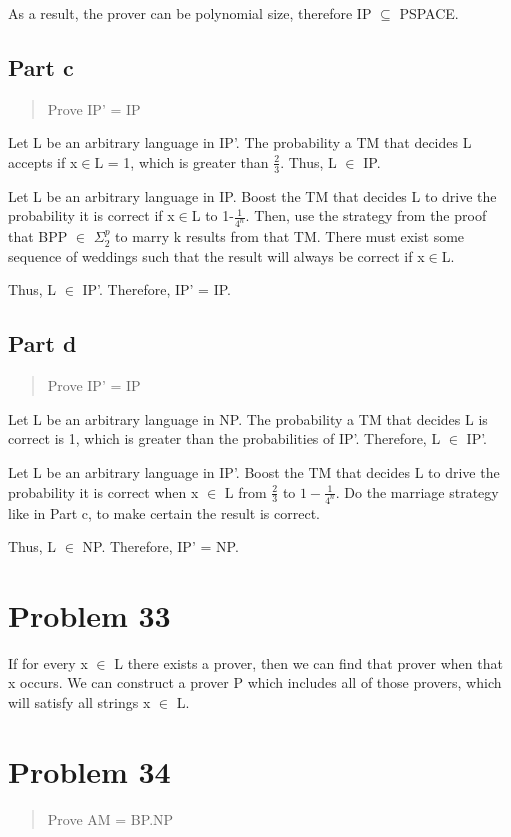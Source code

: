 \documentclass{article}
\begin{document}
\medskip
As a result, the prover can be polynomial size, therefore IP $\subseteq$ PSPACE.


\subsection{Part c}
\begin{quote}
Prove IP' = IP
\end{quote}

Let L be an arbitrary language in IP'.  The probability a TM that decides L accepts if x$\in$L = 1, which is greater than $\frac23$.  Thus, L $\in$ IP.

Let L be an arbitrary language in IP.  Boost the TM that decides L to drive the probability it is correct if x$\in$L to 1-$\frac1{4^n}$.  Then, use the strategy from the proof that BPP $\in$ $\Sigma_2^p$ to marry k results from that TM.  There must exist some sequence of weddings such that the result will always be correct if x$\in$L.  

Thus, L $\in$ IP'.  Therefore, IP' = IP.


\subsection{Part d}
\begin{quote}
Prove IP' = IP
\end{quote}

Let L be an arbitrary language in NP.  The probability a TM that decides L is correct is 1, which is greater than the probabilities of IP'.  Therefore, L $\in$ IP'.

Let L be an arbitrary language in IP'.  Boost the TM that decides L to drive the probability it is correct when x $\in$ L from $\frac23$ to $1-\frac1{4^n}$.  Do the marriage strategy like in Part c, to make certain the result is correct.  

Thus, L $\in$ NP.  Therefore, IP' = NP.


\section{Problem 33}

If for every x $\in$ L there exists a prover, then we can find that prover when that x occurs.  We can construct a prover P which includes all of those provers, which will satisfy all strings x $\in$ L.


\section{Problem 34}
\begin{quote}
Prove AM = BP.NP
\end{quote}
\end{document}
